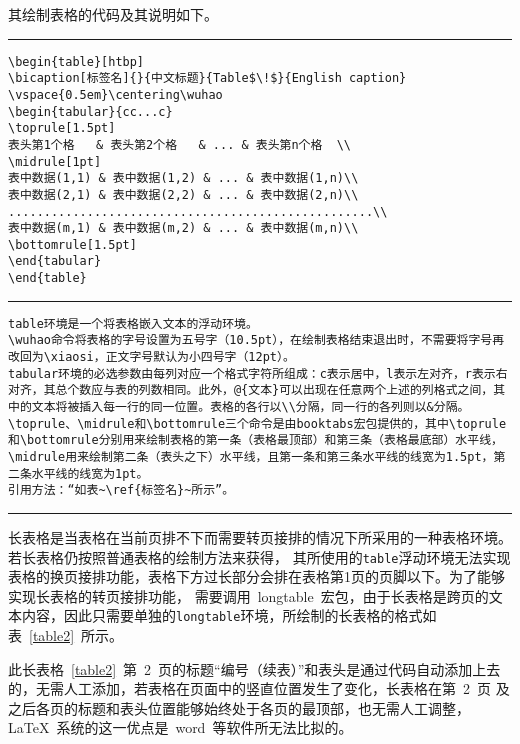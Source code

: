 其绘制表格的代码及其说明如下。
\vspace{1em}\noindent\hrule
\begin{verbatim}
\begin{table}[htbp]
\bicaption[标签名]{}{中文标题}{Table$\!$}{English caption}
\vspace{0.5em}\centering\wuhao
\begin{tabular}{cc...c}
\toprule[1.5pt]
表头第1个格   & 表头第2个格   & ... & 表头第n个格  \\
\midrule[1pt]
表中数据(1,1) & 表中数据(1,2) & ... & 表中数据(1,n)\\
表中数据(2,1) & 表中数据(2,2) & ... & 表中数据(2,n)\\
...................................................\\
表中数据(m,1) & 表中数据(m,2) & ... & 表中数据(m,n)\\
\bottomrule[1.5pt]
\end{tabular}
\end{table}
\end{verbatim}
\noindent\hrule
\begin{verbatim}
table环境是一个将表格嵌入文本的浮动环境。
\wuhao命令将表格的字号设置为五号字（10.5pt），在绘制表格结束退出时，不需要将字号再改回为\xiaosi，正文字号默认为小四号字（12pt）。
tabular环境的必选参数由每列对应一个格式字符所组成：c表示居中，l表示左对齐，r表示右对齐，其总个数应与表的列数相同。此外，@{文本}可以出现在任意两个上述的列格式之间，其中的文本将被插入每一行的同一位置。表格的各行以\\分隔，同一行的各列则以&分隔。
\toprule、\midrule和\bottomrule三个命令是由booktabs宏包提供的，其中\toprule和\bottomrule分别用来绘制表格的第一条（表格最顶部）和第三条（表格最底部）水平线，\midrule用来绘制第二条（表头之下）水平线，且第一条和第三条水平线的线宽为1.5pt，第二条水平线的线宽为1pt。
引用方法：“如表~\ref{标签名}~所示”。
\end{verbatim}
\noindent\hrule


长表格是当表格在当前页排不下而需要转页接排的情况下所采用的一种表格环境。若长表格仍按照普通表格的绘制方法来获得，
其所使用的\verb|table|浮动环境无法实现表格的换页接排功能，表格下方过长部分会排在表格第1页的页脚以下。为了能够实现长表格的转页接排功能，
需要调用~longtable~宏包，由于长表格是跨页的文本内容，因此只需要单独的\verb|longtable|环境，所绘制的长表格的格式如表~\ref{table2}~所示。

此长表格~\ref{table2}~第~2~页的标题“编号（续表）”和表头是通过代码自动添加上去的，无需人工添加，若表格在页面中的竖直位置发生了变化，长表格在第~2~页
及之后各页的标题和表头位置能够始终处于各页的最顶部，也无需人工调整，\LaTeX~系统的这一优点是~word~等软件所无法比拟的。

